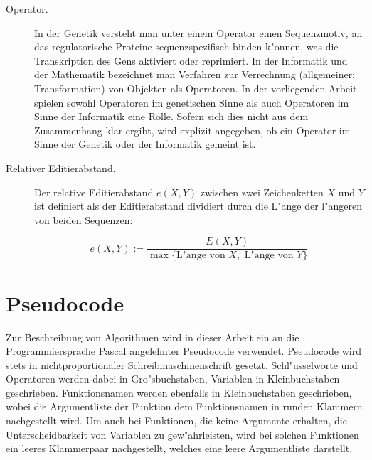 \begin{description}
\item[Operator.] In der Genetik versteht man unter einem Operator einen Sequenzmotiv, an das regulatorische
Proteine sequenzspezifisch binden k"onnen, was die Transkription des Gens aktiviert oder reprimiert.
In der Informatik und der Mathematik bezeichnet man Verfahren zur Verrechnung (allgemeiner: Transformation)
von Objekten als Operatoren. In der vorliegenden Arbeit spielen sowohl Operatoren im genetischen Sinne
als auch Operatoren im Sinne der Informatik eine Rolle. Sofern sich dies nicht aus dem Zusammenhang klar
ergibt, wird explizit angegeben, ob ein Operator im Sinne der Genetik oder der Informatik gemeint ist.

\item[Relativer Editierabstand.] Der relative Editierabstand $e(X,Y)$ zwischen zwei Zeichenketten $X$ und $Y$
ist definiert als der Editierabstand dividiert durch die L"ange der l"angeren von beiden Sequenzen:

\begin{displaymath}
e(X, Y) := \frac{E(X, Y)}{\max\{\mbox{L"ange von $X$}, \mbox{ L"ange von $Y$}\}}
\end{displaymath}


\end{description}

% 
% 

\section{Pseudocode}

Zur Beschreibung von Algorithmen wird in dieser Arbeit ein an die
Programmiersprache Pascal angelehnter Pseudocode verwendet. Pseudocode
wird stets in nichtproportionaler Schreibmaschinenschrift gesetzt.
Schl"usselworte
und Operatoren werden dabei in Gro"sbuchstaben, Variablen in Kleinbuchstaben
geschrieben. Funktionsnamen werden ebenfalls in Kleinbuchstaben geschrieben,
wobei die Argumentliste der Funktion dem Funktionsnamen in runden Klammern
nachgestellt wird. Um auch bei Funktionen, die keine Argumente erhalten,
die Unterscheidbarkeit von Variablen zu gew"ahrleisten, wird bei solchen
Funktionen ein leeres Klammerpaar nachgestellt, welches eine leere Argumentliste
darstellt.

